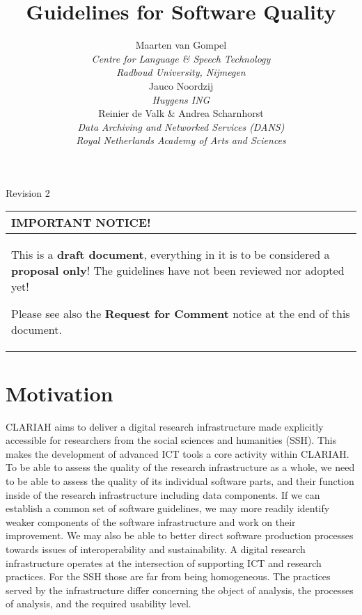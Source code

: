 \documentclass[a4paper,11pt]{article}
\newcommand{\subtitle}[1]{%
  \posttitle{%
    \par\end{center}
    \begin{center}\large#1\end{center}
    \vskip0.5em}%
}
\newenvironment{notice}{
\begin{center}
    \begin{tabular}[h!]{|p{0.8\textwidth}|}
    \hline
    {\bf IMPORTANT NOTICE!}\\\hline}
{   \\\hline
    \end{tabular}
\end{center}}
\begin{document}
\title{Guidelines for Software Quality}
\subtitle{CLARIAH Task 54.100} 
\author{Maarten van Gompel \\ 
\emph{Centre for Language \& Speech Technology} \\ \emph{Radboud University, Nijmegen} \\  
Jauco Noordzij \\	
\emph{Huygens ING} \\
Reinier de Valk \& Andrea Scharnhorst \\ 
\emph{Data Archiving and Networked Services (DANS)} \\ \emph{Royal Netherlands Academy of Arts and Sciences}}


\maketitle

\begin{center}
Revision 2
\end{center}

\begin{notice} 
This is a \textbf{draft document}, everything in it is to be considered a
\textbf{proposal only}! The guidelines have not been reviewed nor adopted yet!

Please see also the \textbf{Request for Comment} notice at the end of this document.
\end{notice}

\tableofcontents

\section{Motivation}

CLARIAH aims to deliver a digital research infrastructure made explicitly
accessible for researchers from the social sciences and humanities (SSH). This makes the development of
advanced ICT tools a core activity within CLARIAH. To be able to assess the
quality of the research infrastructure as a whole, we need to be able to assess
the quality of its individual software parts, and their function inside of the
research infrastructure including data components. If we can establish a common
set of software guidelines, we may more readily identify weaker components of
the software infrastructure and work on their improvement. We may also be able
to better direct software production processes towards issues of
interoperability and sustainability.  A digital research infrastructure
operates at the intersection of supporting ICT and research practices. For the SSH those are far from being homogeneous. The
practices served by the infrastructure differ concerning the object of
analysis, the processes of analysis, and the required usability level. 
\end{document}
